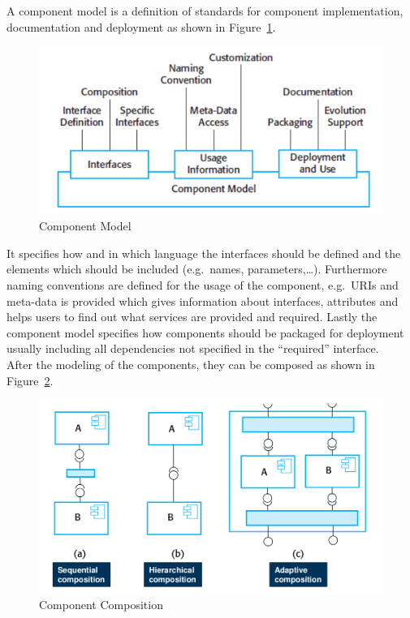 A component model is a definition of standards for component implementation, documentation and deployment as shown in Figure~\ref{fig:component_model}.
\begin{figure}[H]
  \centering
  \includegraphics[width=.7\textwidth]{images/component_model.png}
  \caption{Component Model}\label{fig:component_model}
\end{figure}
It specifies how and in which language the interfaces should be defined and the elements which should be included (e.g.\ names, parameters,\ldots).
Furthermore naming conventions are defined for the usage of the component, e.g.\ URIs and meta-data is provided which gives information about interfaces, attributes and helps users to find out what services are provided and required.
Lastly the component model specifies how components should be packaged for deployment usually including all dependencies not specified in the ``required'' interface.\\

After the modeling of the components, they can be composed as shown in Figure~\ref{fig:component_composition}.
\newline

\begin{figure}[H]
  \centering
  \includegraphics[width=.7\textwidth]{images/component_composition.png}
  \caption{Component Composition}\label{fig:component_composition}
\end{figure}

